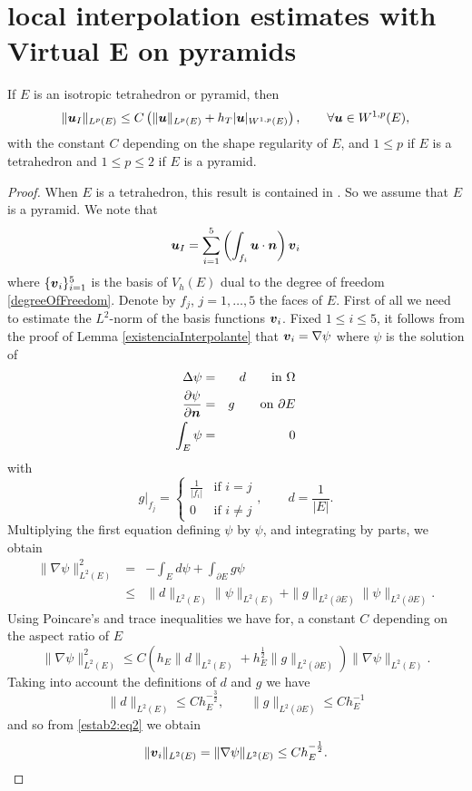 \section{local interpolation estimates with Virtual E on pyramids}

\begin{theorem}
If $E$ is an isotropic tetrahedron or pyramid, then  
\begin{equation}\label{estab2}
\|\boldsymbol{u}_I\|_{L^p(E)}\le C\left(\|\boldsymbol{u}\|_{L^p(E)}+ h_T|\boldsymbol{u}|_{W^{1,p}(E)}\right), \qquad \forall \boldsymbol{u}\in W^{1,p}(E),
\end{equation}
with the constant $C$ depending on the shape regularity of $E$, and $1\le p$ if $E$ is a tetrahedron and $1\le p\le 2$ if $E$ is a pyramid.
\end{theorem}
\begin{proof}
When $E$ is a tetrahedron, this result is contained in \cite{AApDL2}. So we assume that $E$ is a pyramid. We note that 
\begin{equation}\label{estab2:eq1}
\boldsymbol{u}_I=\sum_{i=1}^5 \left(\int_{f_i}\boldsymbol{u}\cdot \boldsymbol{n}\right)\boldsymbol{v}_i
\end{equation}
where $\{\boldsymbol{v}_i\}_{i=1}^5$ is the basis of $V_h(E)$ dual to the degree of freedom \eqref{degreeOfFreedom}. Denote by $f_j$, $j=1,\ldots,5$ the faces of $E$. First of all we need to estimate the $L^2$-norm of the basis functions $\boldsymbol{v}_i$. Fixed $1\le i\le 5$, it follows from the proof of Lemma \ref{existenciaInterpolante} that $\boldsymbol{v}_i=\nabla \psi$ where $\psi$ is the solution of
\begin{eqnarray*}
\Delta\psi&=&d\qquad\mbox{in }\Omega\\ \frac{\partial\psi}{\partial\boldsymbol{n}}&=&g\qquad\mbox{on }\partial E\\ \int_E\psi&=&0
\end{eqnarray*}
with
\[
g|_{f_j}=\left\{\begin{array}{cl}\frac1{|f_i|}&\mbox{if }i=j\\0&\mbox{if }i\ne j\end{array}\right., \qquad d=\frac1{|E|}.
\]
Multiplying the first equation defining $\psi$ by $\psi$, and integrating by parts, we obtain
\begin{eqnarray*}
\|\nabla\psi\|_{L^2(E)}^2 &=& -\int_Ed\psi + \int_{\partial E}g\psi\\ &\le& 
\|d\|_{L^2(E)}\|\psi\|_{L^2(E)} + \|g\|_{L^2(\partial E)}\|\psi\|_{L^2(\partial E)}.
\end{eqnarray*}
Using Poincare's and trace inequalities we have for, a constant $C$ depending on the aspect ratio of $E$ 
\begin{equation}\label{estab2:eq2}
\|\nabla\psi\|_{L^2(E)}^2\le  C\left(h_E\|d\|_{L^2(E)} + h_E^\frac12 \|g\|_{L^2(\partial E)}\right) \|\nabla\psi\|_{L^2(E)}.
\end{equation}
Taking into account the definitions of $d$ and $g$ we have
\[
\|d\|_{L^2(E)}\le Ch_E^{-\frac32}, \qquad \|g\|_{L^2(\partial E)}\le Ch_E^{-1}
\]
and so from \eqref{estab2:eq2} we obtain
\begin{equation}\label{estab2:eq3}
\|\boldsymbol{v}_i\|_{L^2(E)}=\|\nabla\psi\|_{L^2(E)}\le Ch_E^{-\frac12}.
\end{equation}


\end{proof}
